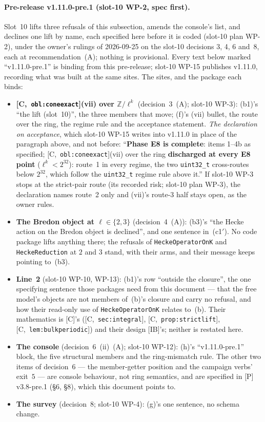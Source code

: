 \documentclass[11pt]{article}
\theoremstyle{remark}
\newcommand{\Z}{\mathbb{Z}}
\newcommand{\HA}[1]{[C,~\texttt{#1}]}      %
\begin{document}
\paragraph{Pre-release v1.11.0-pre.1 (slot-10 WP-2, spec first).} Slot~10 lifts three refusals of
this subsection, amends the console's list, and declines one lift by name, each specified here
before it is coded (slot-10 plan WP-2), under the owner's rulings of 2026-09-25 on the slot-10
decisions 3, 4, 6 and~8, each at recommendation~(A); nothing is provisional. Every text below
marked ``v1.11.0-pre.1'' is binding from this pre-release; slot-10 WP-15 publishes v1.11.0,
recording what was built at the same sites. The sites, and the package each binds:
\begin{itemize}
\item \textbf{\HA{obl:coneexact}(vii) over $\Z/\ell^k$} (decision~3~(A); slot-10 WP-3): (b1)'s
  ``the lift (slot~10)'', the three members that move; (f)'s (vii) bullet, the route over the ring,
  the regime rule and the acceptance statement. \emph{The declaration on acceptance}, which slot-10
  WP-15 writes into v1.11.0 in place of the paragraph above, and not before: ``\textbf{Phase E8 is
  complete}: items 1--4b as specified; \HA{obl:coneexact}(vii) over the ring \textbf{discharged at
  every E8 point} ($\ell^k<2^{32}$): route~1 in every regime, the two \texttt{uint32\_t}
  cross-routes below $2^{32}$, which follow the \texttt{uint32\_t} regime rule above it.'' If
  slot-10 WP-3 stops at the strict-pair route (its recorded risk; slot-10 plan WP-3), the
  declaration names route~2 only and (vii)'s route-3 half stays open, as the owner rules.
\item \textbf{The Bredon object at $\ell\in\{2,3\}$} (decision~4~(A)): (b3)'s ``the Hecke action on
  the Bredon object is declined'', and one sentence in~(c1$'$). No code package lifts anything
  there; the refusals of \texttt{HeckeOperatorOnK} and \texttt{HeckeReduction} at $2$ and $3$ stand,
  with their arms, and their message keeps pointing to~(b3).
\item \textbf{Line~2} (slot-10 WP-10, WP-13): (b1)'s row ``outside the closure'', the one
  specifying sentence those packages need from this document --- that the free model's objects
  are not members of~(b)'s closure and carry no refusal, and how their read-only use of
  \texttt{HeckeOperatorOnK} relates to~(b). Their mathematics is [C]'s (\HA{sec:integral},
  \HA{prop:strictlift}, \HA{lem:bulkperiodic}) and their design [IB]'s; neither is restated here.
\item \textbf{The console} (decision~6~(ii)~(A); slot-10 WP-12): (h)'s ``v1.11.0-pre.1'' block, the
  five structural members and the ring-mismatch rule. The other two items of decision~6 --- the
  member-getter position and the campaign verbs' exit~$5$ --- are console behaviour, not ring
  semantics, and are specified in [P] v3.8-pre.1 (\S6, \S8), which this document points to.
\item \textbf{The survey} (decision~8; slot-10 WP-4): (g)'s one sentence, no schema change.
\end{itemize}
\end{document}
